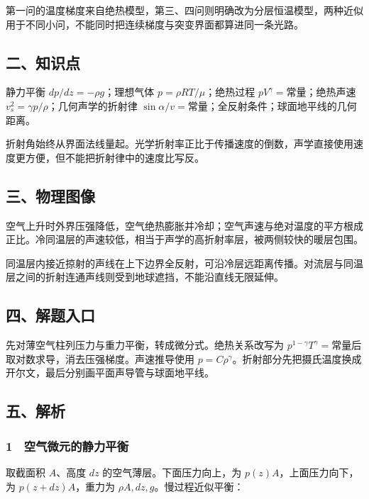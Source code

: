 \documentclass[12pt,a4paper,fontset=fandol]{ctexart}
\begin{document}
第一问的温度梯度来自绝热模型，第三、四问则明确改为分层恒温模型，两种近似用于不同小问，不能同时把连续梯度与突变界面都算进同一条光路。

\subsection{二、知识点}\label{ux4e8cux77e5ux8bc6ux70b9-6}

静力平衡 \(dp/dz=-\rho g\)；理想气体 \(p=\rho RT/\mu\)；绝热过程
\(pV^\gamma=\)常量；绝热声速 \(v_s^2=\gamma p/\rho\)；几何声学的折射律
\(\sin\alpha/v=\)常量；全反射条件；球面地平线的几何距离。

折射角始终从界面法线量起。光学折射率正比于传播速度的倒数，声学直接使用速度更方便，但不能把折射律中的速度比写反。

\subsection{三、物理图像}\label{ux4e09ux7269ux7406ux56feux50cf-6}

空气上升时外界压强降低，空气绝热膨胀并冷却；空气声速与绝对温度的平方根成正比。冷同温层的声速较低，相当于声学的高折射率层，被两侧较快的暖层包围。

同温层内接近掠射的声线在上下边界全反射，可沿冷层远距离传播。对流层与同温层之间的折射连通声线则受到地球遮挡，不能沿直线无限延伸。

\subsection{四、解题入口}\label{ux56dbux89e3ux9898ux5165ux53e3-6}

先对薄空气柱列压力与重力平衡，转成微分式。绝热关系改写为
\(p^{1-\gamma}T^\gamma=\)常量后取对数求导，消去压强梯度。声速推导使用
\(p=C\rho^\gamma\)。折射部分先把摄氏温度换成开尔文，最后分别画平面声导管与球面地平线。

\subsection{五、解析}\label{ux4e94ux89e3ux6790-6}

\subsubsection{1　空气微元的静力平衡}\label{ux7a7aux6c14ux5faeux5143ux7684ux9759ux529bux5e73ux8861}

取截面积 \(A\)、高度 \(dz\) 的空气薄层。下面压力向上，为
\(p(z)A\)，上面压力向下，为 \(p(z+dz)A\)，重力为
\(\rho A,dz,g\)。慢过程近似平衡：
\end{document}
